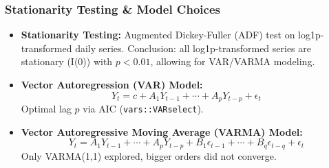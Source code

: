 \documentclass[svgnames, 12pt]{beamer}
\begin{document}
\begin{frame}
    \frametitle{Stationarity Testing \& Model Choices}
    \begin{itemize}
        \item \textbf{Stationarity Testing:} Augmented Dickey-Fuller (ADF) test on log1p-transformed daily series.
        Conclusion: all log1p-transformed series are stationary (I(0)) with $p < 0.01$, allowing for VAR/VARMA modeling.

        \item \textbf{Vector Autoregression (VAR) Model:}
            \[ Y_t = c + A_1 Y_{t-1} + \cdots + A_p Y_{t-p} + \epsilon_t \]
            Optimal lag $p$ via AIC (\texttt{vars::VARselect}).

        \item \textbf{Vector Autoregressive Moving Average (VARMA) Model:}
            \[ Y_t = A_1 Y_{t-1} + \cdots + A_p Y_{t-p} + B_1 \epsilon_{t-1} + \cdots + B_q \epsilon_{t-q} + \epsilon_t \]
            Only VARMA(1,1) explored, bigger orders did not converge.
    \end{itemize}
\end{frame}

\end{document}
